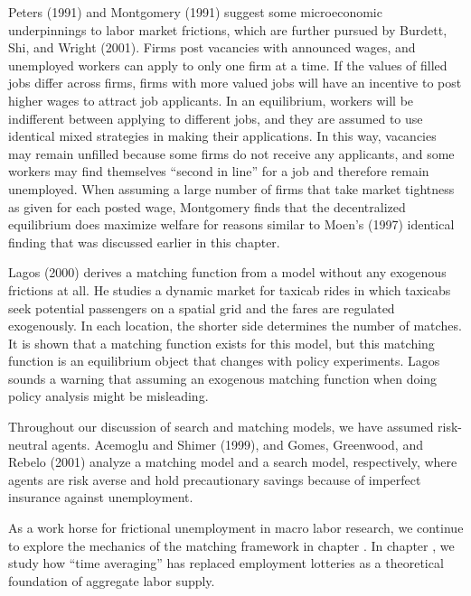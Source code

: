 Peters (1991) and Montgomery (1991)
suggest some microeconomic underpinnings to
labor market frictions, which are further pursued by Burdett, Shi, and Wright (2001).
%
Firms post vacancies with announced wages, and unemployed workers can  apply
to only one firm at a time. If the values of filled jobs differ across firms, firms
with more valued jobs will have an incentive to post higher wages to attract job
applicants. In an equilibrium, workers will be indifferent between applying to
different jobs, and they are assumed to use identical mixed strategies in
making their applications. In this way, vacancies may remain
unfilled because some firms do not receive any
applicants, and some workers may find themselves ``second in line''
for a job and therefore remain unemployed.
When assuming a large number of firms that take market tightness as
given for each posted wage, Montgomery finds that the decentralized
equilibrium does maximize welfare for reasons similar to Moen's (1997)
identical finding that was discussed earlier in this chapter.

Lagos (2000)
%
 derives a matching function from a model without
any exogenous frictions at all. He studies a dynamic market for taxicab
rides in which taxicabs seek potential passengers on a spatial grid and
the fares are regulated exogenously. In each location, the shorter side
determines the number of matches. It is shown that a matching function
exists for this model, but this matching function is an equilibrium
object that changes with policy experiments. Lagos sounds a warning
that assuming an exogenous matching function when doing policy analysis
might be misleading.

\newpage

Throughout our discussion of search and matching models, we have
assumed risk-neutral agents. Acemoglu and Shimer (1999), and
Gomes, Greenwood, and Rebelo (2001)
 analyze a matching model and a search model,
respectively, where agents are risk averse and hold precautionary
savings because of imperfect insurance against unemployment.
  
 

As a work horse for frictional unemployment in macro labor research,
we continue to explore the mechanics of the matching framework in
chapter . In chapter , we study
how ``time averaging'' has replaced employment lotteries as a
theoretical foundation of  aggregate labor supply.

